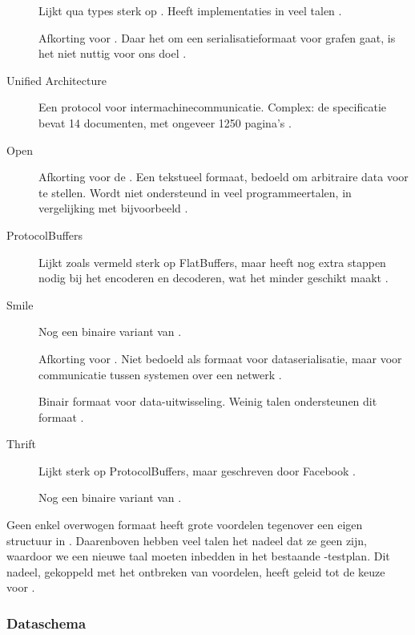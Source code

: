\begin{description}
    Lijkt qua types sterk op .
    Heeft implementaties in veel talen \autocite{messagepack}.
    \item[\acronym{OGDL}] Afkorting voor .
    Daar het om een serialisatieformaat voor grafen gaat, is het niet nuttig voor ons doel \autocite{ogdl}.
    \item[\acronym{OPC} Unified Architecture] Een protocol voor intermachinecommunicatie.
    Complex: de specificatie bevat 14 documenten, met ongeveer 1250 pagina's \autocite{tr62541}.
    \item[Open\acronym{DLL}] Afkorting voor de .
    Een tekstueel formaat, bedoeld om arbitraire data voor te stellen.
    Wordt niet ondersteund in veel programmeertalen, in vergelijking met bijvoorbeeld  \autocite{openddl}.
    \item[ProtocolBuffers] Lijkt zoals vermeld sterk op FlatBuffers, maar heeft nog extra stappen nodig bij het encoderen en decoderen, wat het minder geschikt maakt \autocite{protobuf}.
    \item[Smile] Nog een binaire variant van  \autocite{smile}.
    \item[\acronym{SOAP}] Afkorting voor .
    Niet bedoeld als formaat voor dataserialisatie, maar voor communicatie tussen systemen over een netwerk \autocite{soap}.
    \item[\acronym{SDXF}] Binair formaat voor data-uitwisseling.
    Weinig talen ondersteunen dit formaat \autocite{rfc3072}.
    \item[Thrift] Lijkt sterk op ProtocolBuffers, maar geschreven door Facebook \autocite{slee2007}.
    \item[\acronym{UBJSON}] Nog een binaire variant van  \autocite{ubjson}.

\end{description}

Geen enkel overwogen formaat heeft grote voordelen tegenover een eigen structuur in .
Daarenboven hebben veel talen het nadeel dat ze geen  zijn, waardoor we een nieuwe taal moeten inbedden in het bestaande -testplan.
Dit nadeel, gekoppeld met het ontbreken van voordelen, heeft geleid tot de keuze voor .

\subsubsection{Dataschema}

